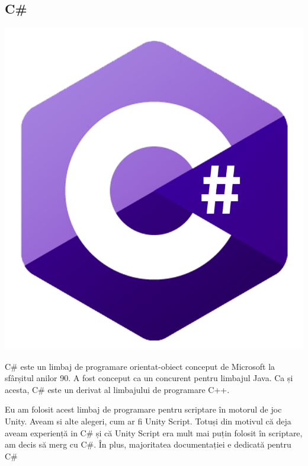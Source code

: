 \documentclass[12pt,a4paper]{article}
\begin{document}
	
	\subsection{C\#}
	
	\begin{center}
		\includegraphics[scale=0.2]{csharp.png}
	\end{center}
	
	\par C\# este un limbaj de programare orientat-obiect conceput de Microsoft la sfârșitul anilor 90. A fost conceput ca un concurent pentru limbajul Java. Ca și acesta, C\# este un derivat al limbajului de programare C++.
	
	\par Eu am folosit acest limbaj de programare pentru scriptare în motorul de joc Unity. Aveam si alte alegeri, cum ar fi Unity Script. Totuși din motivul că deja aveam experiență in C\# și că Unity Script era mult mai puțin folosit în scriptare, am decis să merg cu C\#. În plus, majoritatea documentației e dedicată pentru C\#
	
	\begin{center}
	\end{center}
	
\end{document}
